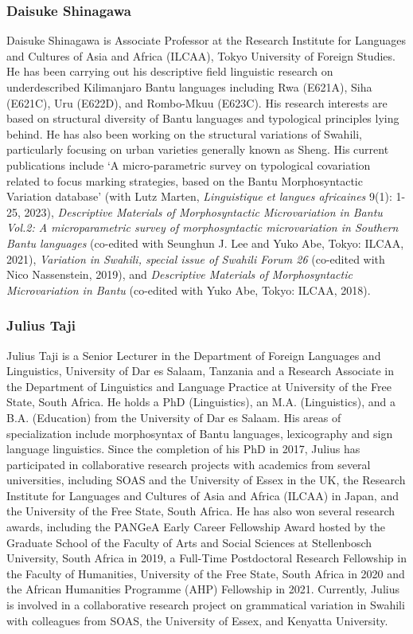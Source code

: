 \subsubsection*{Daisuke Shinagawa }
Daisuke Shinagawa is Associate Professor at the Research Institute for Languages and Cultures of Asia and Africa (ILCAA), Tokyo University of Foreign Studies. He has been carrying out his descriptive field linguistic research on underdescribed Kilimanjaro Bantu languages including Rwa (E621A), Siha (E621C), Uru (E622D), and Rombo-Mkuu (E623C). His research interests are based on structural diversity of Bantu languages and typological principles lying behind. He has also been working on the structural variations of Swahili, particularly focusing on urban varieties generally known as Sheng. His current publications include ‘A micro-parametric survey on typological covariation related to focus marking strategies, based on the Bantu Morphosyntactic Variation database’ (with Lutz Marten, \textit{Linguistique et langues africaines} 9(1): 1-25, 2023), \textit{Descriptive Materials of Morphosyntactic Microvariation in Bantu} \textit{Vol.2: A microparametric survey of morphosyntactic microvariation in Southern Bantu languages} (co-edited with Seunghun J. Lee and Yuko Abe, Tokyo: ILCAA, 2021), \textit{Variation in Swahili, special issue of Swahili Forum 26} (co-edited with Nico Nassenstein, 2019), and \textit{Descriptive Materials of Morphosyntactic Microvariation in Bantu} (co-edited with Yuko Abe, Tokyo: ILCAA,  2018).

\subsubsection*{Julius Taji }
Julius Taji is a Senior Lecturer in the Department of Foreign Languages and Linguistics, University of Dar es Salaam, Tanzania and a Research Associate in the Department of Linguistics and Language Practice at University of the Free State, South Africa. He holds a PhD (Linguistics), an M.A. (Linguistics), and a B.A. (Education) from the University of Dar es Salaam. His areas of specialization include morphosyntax of Bantu languages, lexicography and sign language linguistics. Since the completion of his PhD in 2017, Julius has participated in collaborative research projects with academics from several universities, including SOAS and the University of Essex in the UK, the Research Institute for Languages and Cultures of Asia and Africa (ILCAA) in Japan, and the University of the Free State, South Africa. He has also won several research awards, including the PANGeA Early Career Fellowship Award hosted by the Graduate School of the Faculty of Arts and Social Sciences at Stellenbosch University, South Africa in 2019, a Full-Time Postdoctoral Research Fellowship in the Faculty of Humanities, University of the Free State, South Africa in 2020 and the African Humanities Programme (AHP) Fellowship in 2021. Currently, Julius is involved in a collaborative research project on grammatical variation in Swahili with colleagues from SOAS, the University of Essex, and Kenyatta University.

